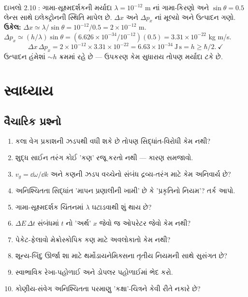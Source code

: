 \begin{dahlo}{દાખલો 2.10 : ગામા-સૂક્ષ્મદર્શકની મર્યાદા}
$\lambda=10^{-12}$ m નાં ગામા-કિરણો અને $\sin\theta=0.5$ લેન્સ સાથે ઇલેક્ટ્રોનની સ્થિતિ માપેલ છે. $\Delta x$ અને $\Delta p_x$ નાં મૂલ્યો અને ઉત્પાદન ગણો.
\tcblower
\textbf{ઉકેલ:} $\Delta x\simeq\lambda/\sin\theta=10^{-12}/0.5=2\times10^{-12}$ m.
$\Delta p_x\simeq(h/\lambda)\sin\theta=(6.626\times10^{-34}/10^{-12})(0.5)=3.31\times10^{-22}$ kg m/s.
\[
\Delta x\,\Delta p_x=2\times10^{-12}\times3.31\times10^{-22}=6.63\times10^{-34}\ \mathrm{J\,s}=h\ge\hbar/2.\ \checkmark
\]
ઉત્પાદન હંમેશાં $\sim h$ ક્રમમાં રહે છે — ઉપકરણ કેમ સુધારાય તોપણ મર્યાદા ટકે છે.
\end{dahlo}

\section{સ્વાધ્યાય}

\subsection{વૈચારિક પ્રશ્નો}
\begin{enumerate}[label=\textbf{Q\arabic*.}]
  \item કલા વેગ પ્રકાશની ઝડપથી વધી શકે છે તોપણ સિદ્ધાંત-વિરોધી કેમ નથી?
  \item શુદ્ધ સાઈન તરંગ કોઈ 'કણ' રજૂ કરતો નથી — કારણ સમજાવો.
  \item $v_g=\dd\omega/\dd k$ અને કણની ઝડપ વચ્ચેનો સંબંધ દ્રવ્ય-તરંગ માટે કેમ અનિવાર્ય છે?
  \item અનિશ્ચિતતા સિદ્ધાંત 'માપન પ્રણાલીની ખામી' છે કે 'પ્રકૃતિનો નિયમ'? તર્ક આપો.
  \item ગામા-સૂક્ષ્મદર્શક ચિંતનમાં $\lambda$ ઘટાડવાથી શું થાય છે?
  \item $\Delta E\,\Delta t$ સંબંધમાં $t$ નો 'અર્થ' $x$ જેવો જ ઓપરેટર જેવો કેમ નથી?
  \item પેકેટ-ફેલાવો મેક્રોસ્કોપિક કણ માટે અવલોકાતો કેમ નથી?
  \item શૂન્ય-બિંદુ ઊર્જા શા માટે થર્મોડાયનેમિક્સના તૃતીય નિયમની સાથે સુસંગત છે?
  \item સ્વાભાવિક રેખા-પહોળાઈ અને ડોપલર પહોળાઈમાં ભેદ કરો.
  \item કોણીય-સંવેગ અનિશ્ચિતતા પરમાણુ 'કક્ષા'-ચિત્રને કેવી રીતે નકારે છે?
\end{enumerate}

